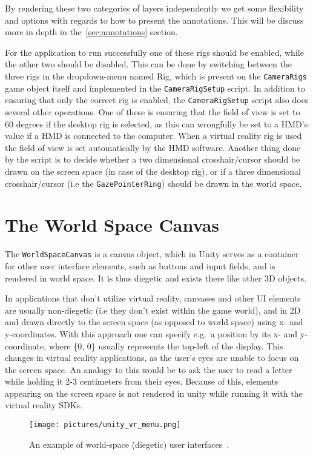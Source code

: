 By rendering these two categories of layers independently we get some flexibility and options with regards to how to present the annotations.
This will be discuss more in depth in the~\vref{sec:annotations} section.

For the application to run successfully one of these rigs should be enabled, while the other two should be disabled.
This can be done by switching between the three rigs in the dropdown-menu named Rig, which is present on the \texttt{CameraRigs} game object itself and
implemented in the \texttt{CameraRigSetup} script. In addition to ensuring that only the correct rig is enabled, 
the \texttt{CameraRigSetup} script also does several other operations. One of these is ensuring that the field of view is set to 60 degrees if the desktop rig 
is selected, as this can wrongfully be set to a HMD's value if a HMD is connected to the computer. When a virtual reality rig is used the field of view is 
set automatically by the HMD software. Another thing done by the script is to decide whether a two dimensional crosshair/cursor should be drawn on the screen space
(in case of the desktop rig), or if a three dimensional crosshair/cursor (i.e the \texttt{GazePointerRing}) should be drawn in the world space. 


\section{The World Space Canvas}
The \texttt{WorldSpaceCanvas} is a canvas object, which in Unity serves as a container for other user interface elements, such as buttons and input fields, 
and is rendered in world space. It is thus diegetic and exists there like other 3D objects.

In applications that don't utilize virtual reality, canvases and other UI elements are usually non-diegetic (i.e they don't exist within the game world), 
and in 2D and drawn directly to the screen space (as opposed to world space) using x- and y-coordinates.
With this approach one can specify e.g.~a position by its x- and y-coordinate, where \{0, 0\} usually represents the top-left of the display.
This changes in virtual reality applications, as the user's eyes are unable to focus on the screen space. An analogy to this would be to 
ask the user to read a letter while holding it 2-3 centimeters from their eyes. Because of this, elements appearing on the screen space is not rendered
in unity while running it with the virtual reality SDKs. 

\begin{figure}%
	\texttt{[image: pictures/unity\_vr\_menu.png]}
	\caption[An example of world-space (diegetic) user interfaces]{An example of world-space (diegetic) user interfaces~\citep{Unity}.}
	\label{fig:unity_vr_menu}
\end{figure} 

